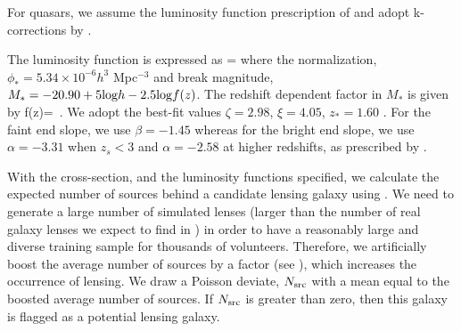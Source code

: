 \documentclass[useAMS,usenatbib,a4paper]{mn2e}
\begin{document}
For quasars, we assume the luminosity function prescription of \citet{Oguri2010}
and adopt k-corrections by \citet{Richards2006}.

The luminosity function is expressed as
\be
{}=
\ee
where the normalization, $\phi_{*}=5.34\times10^{-6} h^3$ Mpc$^{-3}$ and break
magnitude, $M_*=-20.90 + 5 {\rm log} h - 2.5 {\rm log} f(z)$. The redshift
dependent factor in $M_*$ is given by
\be
f(z)= \,.
\ee
We adopt the best-fit values $\zeta=2.98$, $\xi=4.05$, $z_{*}=1.60$
\citep{Oguri2010}. For the faint end slope, we use $\beta=-1.45$ whereas for
the bright end slope, we use $\alpha=-3.31$ when $z_s<3$ and $\alpha=-2.58$ at
higher redshifts, as prescribed by \citet{Oguri2010}.

With the cross-section, and the luminosity functions specified, we
calculate the expected number of sources behind a candidate lensing
galaxy using . We need to generate a large number of
simulated lenses (larger than the number of real galaxy lenses we expect
to find in \cfhtls) in order to have a reasonably large and diverse
training sample for thousands of \sw volunteers. Therefore, we
artificially boost the average number of sources by a factor (see
), which increases the occurrence of lensing. We
draw a Poisson deviate, $N_{\rm src}$ with a mean equal to the boosted
average number of sources. If $N_{\rm src}$ is greater than zero, then
this galaxy is flagged as a potential lensing galaxy.
\end{document}
